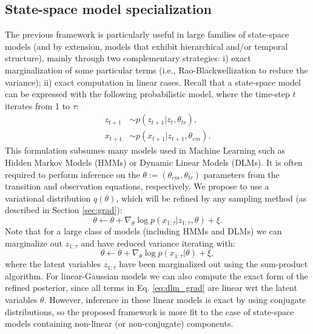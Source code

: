 \subsection{State-space model specialization}\label{sec:ss}
The previous framework is particularly useful in large families of state-space models (and by extension, models that exhibit hierarchical and/or temporal structure), mainly through two complementary strategies: i) exact marginalization of some particular terms (i.e., Rao-Blackwellization \cite{murray2018delayed} to reduce the variance); ii) exact computation in linear cases. %
Recall that a state-space model \cite{hamilton1994state} can be expressed with the following probabilistic model, where the time-step $t$ iterates from 1 to $\tau$:
\begin{align*}
    z_{t+1} &\sim p(z_{t+1} | z_t, \theta_{tr}), \\
    x_{t+1} &\sim p(x_{t+1} | z_{t+1}, \theta_{em}).
\end{align*}
This formulation subsumes many models used in Machine Learning such as Hidden Markov Models (HMMs) or Dynamic Linear Models (DLMs). It is often required to perform inference on the $\theta := (\theta_{em}, \theta_{tr})$ parameters from the transition and observation equations, respectively. We propose to use a variational distribution $q(\theta)$, which will be refined by any sampling method (as described in Section \ref{sec:grad}):
\begin{equation}
\theta \leftarrow \theta + \nabla_{\theta} \log p(x_{1:\tau}|z_{1:\tau},\theta) + \xi.
\end{equation}
Note that for a large class of models (including HMMs and DLMs) we can marginalize out $z_{1:\tau}$ and have reduced variance iterating with:
\begin{equation}\label{eq:dlm_grad}
\theta \leftarrow \theta + \nabla_{\theta} \log p(x_{1:\tau}|\theta) + \xi,
\end{equation}
where the latent variables $z_{1:\tau}$ have been marginalized out using the sum-product algorithm. For linear-Gaussian models we can also compute the exact form of the refined posterior, since all terms in Eq. \ref{eq:dlm_grad} are linear wrt the latent variables $\theta$. However, inference in these linear models is exact by using conjugate distributions, so the proposed framework is more fit to the case of state-space models containing non-linear (or non-conjugate) components. %
\fi



